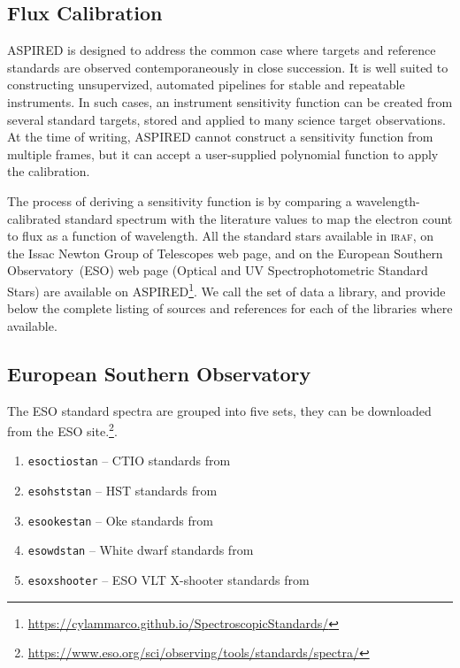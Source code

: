\documentclass[linenumbers, twocolumn]{aastex631}
\begin{document}
\subsection{Flux Calibration}
\textsc{ASPIRED} is designed to address the common case where targets and
reference standards are observed contemporaneously in close succession. It is
well suited to constructing unsupervized, automated pipelines for stable and
repeatable instruments. In such cases, an instrument sensitivity function can be
created from several standard targets, stored and applied to many science target
observations. At the time of writing, \textsc{ASPIRED} cannot construct a
sensitivity function from multiple frames, but it can accept a user-supplied
polynomial function to apply the calibration.
 
The process of deriving a sensitivity function is by comparing a
wavelength-calibrated standard spectrum with the literature values to map the
electron count to flux as a function of wavelength. All the standard stars
available in \textsc{iraf}, on the Issac Newton Group of Telescopes web page,
and on the European Southern Observatory~(ESO) web page (Optical and UV
Spectrophotometric Standard Stars)
are available on \textsc{ASPIRED}\footnote{\url{https://cylammarco.github.io/SpectroscopicStandards/}}. We call the set of data a library,
and provide below the complete listing of sources and references for each of
the libraries where available.

\subsection*{European Southern Observatory}
The ESO standard spectra are grouped into five sets, they can be downloaded from
the ESO site.\footnote{\url{https://www.eso.org/sci/observing/tools/standards/spectra/}}.

\begin{enumerate}
    \item \texttt{esoctiostan} -- CTIO standards from \citet{1992PASP..104..533H, 1994PASP..106..566H}
    \item \texttt{esohststan} -- HST standards from \citet{1995AJ....110.1316B, 1996AJ....111.1743B}
    \item \texttt{esookestan} -- Oke standards from \citet{1990AJ.....99.1621O}
    \item \texttt{esowdstan} -- White dwarf standards from \citet{1995AJ....110.1316B}
    \item \texttt{esoxshooter} -- ESO VLT X-shooter standards from \citet{2014Msngr.158...16M, 2014A&A...568A...9M}
\end{enumerate}
\end{document}
